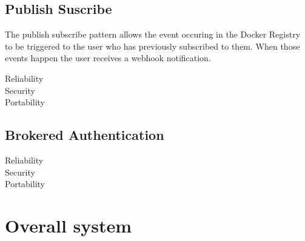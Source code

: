 \subsection{Publish Suscribe}

The publish subscribe pattern allows the event occuring in the Docker Registry to be triggered to the user who has previously subscribed to them. When those events happen the user receives a webhook notification.

Reliability \\
Security \\
Portability \\

\subsection{Brokered Authentication}
Reliability \\
Security \\
Portability \\


\section{Overall system}